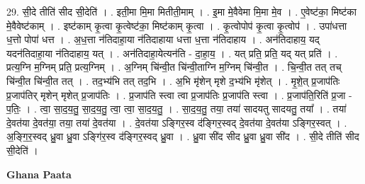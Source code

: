 \documentclass[17pt]{extarticle}
\begin{document}
29. सी॒दे तीति॑ सीद सी॒देति॑ । . इती॒मा मि॒मा मितीती॒माम् । . इ॒मा मे॒वैवेमा मि॒मा मे॒व । . ए॒वेष्ट॑का॒ मिष्ट॑का मे॒वैवेष्ट॑काम् । . इष्ट॑काम् कृ॒त्वा कृ॒त्वेष्ट॑का॒ मिष्ट॑काम् कृ॒त्वा । . कृ॒त्वोपोप॑ कृ॒त्वा कृ॒त्वोप॑ । . उपा॑धत्ता ध॒त्तो पोपा॑ धत्त । . अ॒ध॒त्ता न॑तिदाहा॒या न॑तिदाहाया धत्ता ध॒त्ता न॑तिदाहाय । . अन॑तिदाहाय॒ यद् यदन॑तिदाहा॒या न॑तिदाहाय॒ यत् । . अन॑तिदाहा॒येत्यन॑ति - दा॒हा॒य॒ । . यत् प्रति॒ प्रति॒ यद् यत् प्रति॑ । . प्रत्य॒ग्नि म॒ग्निम् प्रति॒ प्रत्य॒ग्निम् । . अ॒ग्निम् चि॑न्वी॒त चि॑न्वी॒ताग्नि म॒ग्निम् चि॑न्वी॒त । . चि॒न्वी॒त तत् तच् चि॑न्वी॒त चि॑न्वी॒त तत् । . तद॒भ्य॑भि तत् तद॒भि । . अ॒भि मृ॑शेन् मृशे द॒भ्य॑भि मृ॑शेत् । . मृ॒शे॒त् प्र॒जाप॑तिः प्र॒जाप॑तिर् मृशेन् मृशेत् प्र॒जाप॑तिः । . प्र॒जाप॑ति स्त्वा त्वा प्र॒जाप॑तिः प्र॒जाप॑ति स्त्वा । . प्र॒जाप॑ति॒रिति॑ प्र॒जा - प॒तिः॒ । . त्वा॒ सा॒द॒य॒तु॒ सा॒द॒य॒तु॒ त्वा॒ त्वा॒ सा॒द॒य॒तु॒ । . सा॒द॒य॒तु॒ तया॒ तया॑ सादयतु सादयतु॒ तया᳚ । . तया॑ दे॒वत॑या दे॒वत॑या॒ तया॒ तया॑ दे॒वत॑या । . दे॒वत॑या ऽङ्गिर॒स्व द॑ङ्गिर॒स्वद् दे॒वत॑या दे॒वत॑या ऽङ्गिर॒स्वत् । . अ॒ङ्गि॒र॒स्वद् ध्रु॒वा ध्रु॒वा ऽङ्गि॑र॒स्व द॑ङ्गिर॒स्वद् ध्रु॒वा । . ध्रु॒वा सी॑द सीद ध्रु॒वा ध्रु॒वा सी॑द । . सी॒दे तीति॑ सीद सी॒देति॑ । \newline

\textbf{Ghana Paata } \newline
\end{document}
